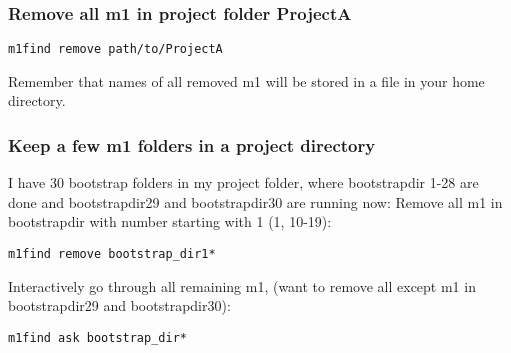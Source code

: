 \documentclass[a4wide,12pt]{article}
\renewcommand{\_}{\textscale{.7}{\textunderscore}}
\begin{document}
\subsubsection*{Remove all m1 in project folder ProjectA}

\begin{verbatim}
m1find remove path/to/ProjectA
\end{verbatim}
Remember that names of all removed m1 will be stored in a file in your home directory.

\subsubsection*{Keep a few m1 folders in a project directory}
I have 30 bootstrap folders in my project folder, where bootstrap\_dir 1-28 are done and
bootstrap\_dir29 and bootstrap\_dir30 are running now:
Remove all m1 in bootstrap\_dir with number starting with 1 (1, 10-19):
\begin{verbatim}
m1find remove bootstrap_dir1*
\end{verbatim}
Interactively go through all remaining m1, (want to remove all except m1 in bootstrap\_dir29 and bootstrap\_dir30): 
\begin{verbatim}
m1find ask bootstrap_dir*
\end{verbatim}
\end{document}
